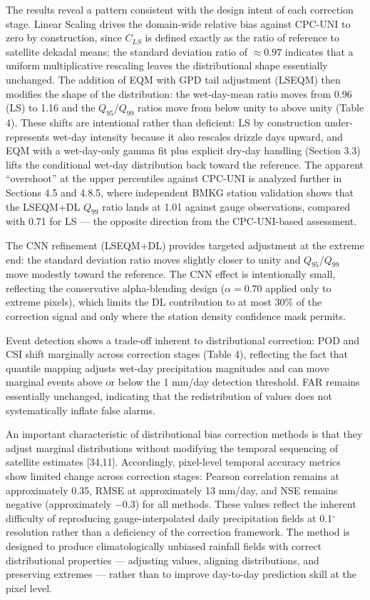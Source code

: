 \documentclass[
]{article}
\begin{document}
The results reveal a pattern consistent with the design intent of each
correction stage. Linear Scaling drives the domain-wide relative bias
against CPC-UNI to zero by construction, since \(C_{LS}\) is defined
exactly as the ratio of reference to satellite dekadal means; the
standard deviation ratio of \(\approx 0.97\) indicates that a uniform
multiplicative rescaling leaves the distributional shape essentially
unchanged. The addition of EQM with GPD tail adjustment (LSEQM) then
modifies the shape of the distribution: the wet-day-mean ratio moves
from 0.96 (LS) to 1.16 and the \(Q_{95}\)/\(Q_{99}\) ratios move from
below unity to above unity (Table 4). These shifts are intentional
rather than deficient: LS by construction under-represents wet-day
intensity because it also rescales drizzle days upward, and EQM with a
wet-day-only gamma fit plus explicit dry-day handling (Section 3.3)
lifts the conditional wet-day distribution back toward the reference.
The apparent ``overshoot'' at the upper percentiles against CPC-UNI is
analyzed further in Sections 4.5 and 4.8.5, where independent BMKG
station validation shows that the LSEQM+DL \(Q_{99}\) ratio lands at
1.01 against gauge observations, compared with 0.71 for LS --- the
opposite direction from the CPC-UNI-based assessment.

The CNN refinement (LSEQM+DL) provides targeted adjustment at the
extreme end: the standard deviation ratio moves slightly closer to unity
and \(Q_{95}\)/\(Q_{99}\) move modestly toward the reference. The CNN
effect is intentionally small, reflecting the conservative
alpha-blending design (\(\alpha = 0.70\) applied only to extreme
pixels), which limits the DL contribution to at most 30\% of the
correction signal and only where the station density confidence mask
permits.

Event detection shows a trade-off inherent to distributional correction:
POD and CSI shift marginally across correction stages (Table 4),
reflecting the fact that quantile mapping adjusts wet-day precipitation
magnitudes and can move marginal events above or below the 1 mm/day
detection threshold. FAR remains essentially unchanged, indicating that
the redistribution of values does not systematically inflate false
alarms.

An important characteristic of distributional bias correction methods is
that they adjust marginal distributions without modifying the temporal
sequencing of satellite estimates {[}34,11{]}. Accordingly, pixel-level
temporal accuracy metrics show limited change across correction stages:
Pearson correlation remains at approximately 0.35, RMSE at approximately
13 mm/day, and NSE remains negative (approximately \(-0.3\)) for all
methods. These values reflect the inherent difficulty of reproducing
gauge-interpolated daily precipitation fields at 0.1\(^{\circ}\)
resolution rather than a deficiency of the correction framework. The
method is designed to produce climatologically unbiased rainfall fields
with correct distributional properties --- adjusting values, aligning
distributions, and preserving extremes --- rather than to improve
day-to-day prediction skill at the pixel level.
\end{document}
